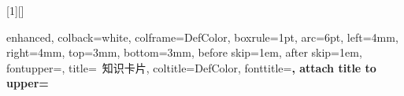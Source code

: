 \newenvironment{steps}[1][步骤详解]
{
    \par\vspace{0.5em}
    \noindent\textbf{\color{ExColor}#1：}
    \begin{enumerate}[label=\textbf{\color{ExColor}\arabic*.}]
}
{
    \end{enumerate}
    \par\vspace{0.5em}
}

[1][]{
    enhanced,
    colback=white,
    colframe=DefColor,
    boxrule=1pt,
    arc=6pt,
    left=4mm, right=4mm, top=3mm, bottom=3mm,
    before skip=1em, after skip=1em,
    fontupper=\small,
    title={\faBookmark\ 知识卡片},
    coltitle=DefColor,
    fonttitle=\bfseries\small,
    attach title to upper={\par\vspace{1mm}}
}

\newenvironment{card}[1][]
{\begin{knowledgecard}{#1}}
{\end{knowledgecard}}
